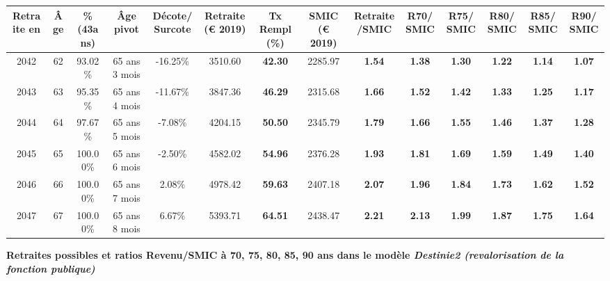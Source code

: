 \begin{adjustbox}{max width=\textwidth} 
\begin{tabular}[htb]{|c|c||c|c|c||c|c||c|c||c|c|c|c|c|} 
\hline 
 Retraite en &  Âge &  \%(43ans) &  Âge pivot &  Décote/Surcote &  Retraite (\euro{} 2019) &  Tx Rempl(\%) &  SMIC (\euro{} 2019) &  Retraite/SMIC &  R70/SMIC &  R75/SMIC &  R80/SMIC &  R85/SMIC &  R90/SMIC \\ 
\hline \hline 
 2042 &  62 &  93.02\% &  65 ans 3 mois &  -16.25\% &  3510.60 &  {\bf 42.30} &  2285.97 &  {\bf 1.54} &  {\bf 1.38} &  {\bf 1.30} &  {\bf 1.22} &  {\bf 1.14} &  {\bf 1.07} \\ 
\hline 
 2043 &  63 &  95.35\% &  65 ans 4 mois &  -11.67\% &  3847.36 &  {\bf 46.29} &  2315.68 &  {\bf 1.66} &  {\bf 1.52} &  {\bf 1.42} &  {\bf 1.33} &  {\bf 1.25} &  {\bf 1.17} \\ 
\hline 
 2044 &  64 &  97.67\% &  65 ans 5 mois &  -7.08\% &  4204.15 &  {\bf 50.50} &  2345.79 &  {\bf 1.79} &  {\bf 1.66} &  {\bf 1.55} &  {\bf 1.46} &  {\bf 1.37} &  {\bf 1.28} \\ 
\hline 
 2045 &  65 &  100.00\% &  65 ans 6 mois &  -2.50\% &  4582.02 &  {\bf 54.96} &  2376.28 &  {\bf 1.93} &  {\bf 1.81} &  {\bf 1.69} &  {\bf 1.59} &  {\bf 1.49} &  {\bf 1.40} \\ 
\hline 
 2046 &  66 &  100.00\% &  65 ans 7 mois &  2.08\% &  4978.42 &  {\bf 59.63} &  2407.18 &  {\bf 2.07} &  {\bf 1.96} &  {\bf 1.84} &  {\bf 1.73} &  {\bf 1.62} &  {\bf 1.52} \\ 
\hline 
 2047 &  67 &  100.00\% &  65 ans 8 mois &  6.67\% &  5393.71 &  {\bf 64.51} &  2438.47 &  {\bf 2.21} &  {\bf 2.13} &  {\bf 1.99} &  {\bf 1.87} &  {\bf 1.75} &  {\bf 1.64} \\ 
\hline 
\hline 
\end{tabular} 
\end{adjustbox} 
 
 \vspace{0.1cm} 
{\bf \noindent Retraites possibles et ratios Revenu/SMIC à 70, 75, 80, 85, 90 ans dans le modèle \emph{Destinie2 (revalorisation de la fonction publique)}}  
 
